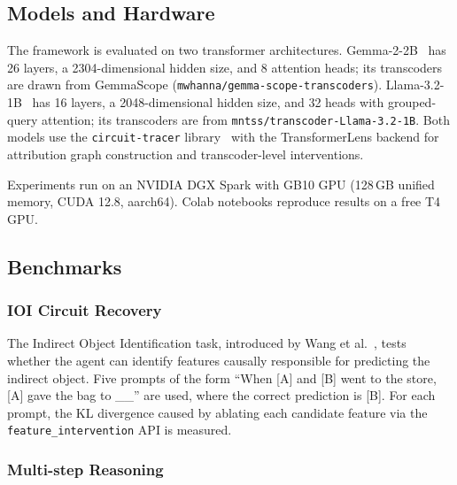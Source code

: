 \subsection{Models and Hardware}

The framework is evaluated on two transformer architectures.
Gemma-2-2B~\cite{team2024gemma} has 26 layers, a 2304-dimensional
hidden size, and 8 attention heads; its transcoders are drawn from
GemmaScope (\texttt{mwhanna/gemma-scope-transcoders}).
Llama-3.2-1B~\cite{Dubey2024llama} has 16 layers, a 2048-dimensional
hidden size, and 32 heads with grouped-query attention; its
transcoders are from \texttt{mntss/transcoder-Llama-3.2-1B}.
Both models use the \texttt{circuit-tracer} library~\cite{Anthropic2025CT}
with the TransformerLens backend for attribution graph construction
and transcoder-level interventions.

Experiments run on an NVIDIA DGX Spark with GB10 GPU (128\,GB unified
memory, CUDA 12.8, aarch64).  Colab notebooks reproduce results on a
free T4 GPU.

\subsection{Benchmarks}

\subsubsection{IOI Circuit Recovery}

The Indirect Object Identification task, introduced by
Wang et al.~\cite{Wang2022}, tests whether the agent can identify
features causally responsible for predicting the indirect object.
Five prompts of the form
``When [A] and [B] went to the store, [A] gave the bag to \_\_''
are used, where the correct prediction is [B].  For each prompt,
the KL divergence caused by ablating each candidate feature via the
\texttt{feature\_intervention} API is measured.

\subsubsection{Multi-step Reasoning}
\label{sec:multistep_benchmark}

